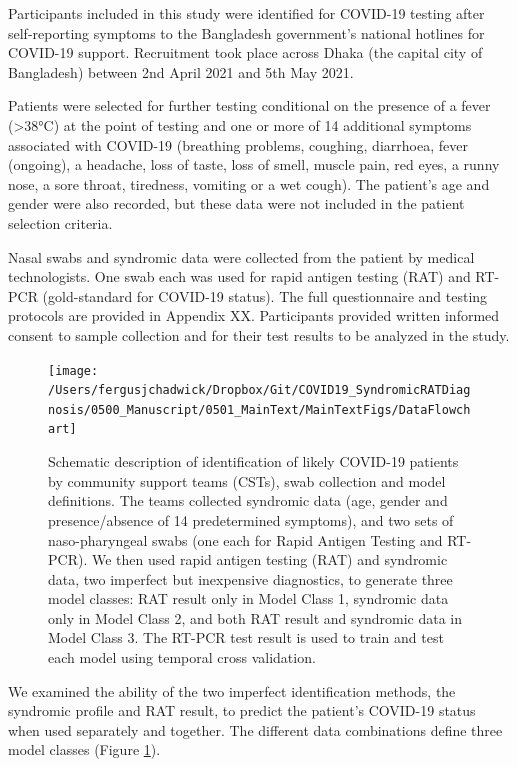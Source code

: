 \documentclass[]{elsarticle} %
\begin{document}
Participants included in this study were identified for COVID-19 testing after self-reporting symptoms to the Bangladesh government's national hotlines for COVID-19 support.
Recruitment took place across Dhaka (the capital city of Bangladesh) between 2nd April 2021 and 5th May 2021.

Patients were selected for further testing conditional on the presence of a fever (\textgreater38°C) at the point of testing and one or more of 14 additional symptoms associated with COVID-19 (breathing problems, coughing, diarrhoea, fever (ongoing), a headache, loss of taste, loss of smell, muscle pain, red eyes, a runny nose, a sore throat, tiredness, vomiting or a wet cough).
The patient's age and gender were also recorded, but these data were not included in the patient selection criteria.

Nasal swabs and syndromic data were collected from the patient by medical technologists.
One swab each was used for rapid antigen testing (RAT) and RT-PCR (gold-standard for COVID-19 status).
The full questionnaire and testing protocols are provided in Appendix XX.
Participants provided written informed consent to sample collection and for their test results to be analyzed in the study.

\begin{figure}
\texttt{[image: /Users/fergusjchadwick/Dropbox/Git/COVID19\_SyndromicRATDiagnosis/0500\_Manuscript/0501\_MainText/MainTextFigs/DataFlowchart]} \caption{Schematic description of identification of likely COVID-19 patients by community support teams (CSTs), swab collection and model definitions. The teams collected syndromic data (age, gender and presence/absence of 14 predetermined symptoms), and two sets of naso-pharyngeal swabs (one each for Rapid Antigen Testing and RT-PCR). We then used rapid antigen testing (RAT) and syndromic data, two imperfect but inexpensive diagnostics, to generate three model classes: RAT result only in Model Class 1, syndromic data only in Model Class 2, and both RAT result and syndromic data in Model Class 3. The RT-PCR test result is used to train and test each model using temporal cross validation.}\label{fig:data-flowchart}
\end{figure}

We examined the ability of the two imperfect identification methods, the syndromic profile and RAT result, to predict the patient's COVID-19 status when used separately and together.
The different data combinations define three model classes (Figure \ref{fig:data-flowchart}).
\end{document}
